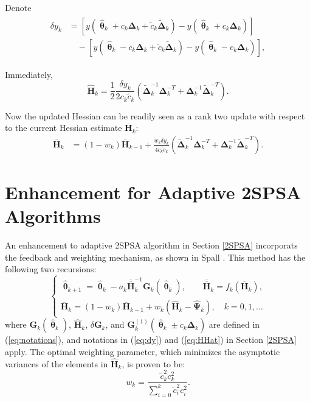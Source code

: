 \documentclass[conference]{IEEEtran}
\newcommand{\bG}{\bm{G}}
\newcommand{\bDelta}{\bm{\Delta}}
\newcommand{\oH}{\bm{\overline{H}}}
\newcommand{\ooH}{\bm{\overline{\overline{H}}}}
\newcommand{\hH}{\bm{\hat{H}}}
\newcommand{\hPsi}{\bm{\hat{\Psi}}}
\newcommand{\htheta}{\bm{\hat{\uptheta}}}
\newcommand{\tDelta}{\bm{\tilde{\Delta}}}
\begin{document}
	Denote
	\begin{align} \label{eq:dy}
		\begin{split}
			\delta y_k&=[y(\htheta_k+c_k\bDelta_k+\tilde{c}_k\tDelta_k)-y(\htheta_k+c_k\bDelta_k)]\\
			&\quad-[y(\htheta_k-c_k\bDelta_k+\tilde{c}_k\tDelta_k)-y(\htheta_k-c_k\bDelta_k)],
		\end{split}
	\end{align}
	
	Immediately,
	\begin{equation} \label{eq:HHat}
		\hH_k=\frac{1}{2}\frac{\delta y_k}{2c_k\tilde{c}_k}\left( \tDelta_k^{-1}\bDelta_k^{-T}+\bDelta_k^{-1}\tDelta_k^{-T} \right).
	\end{equation}
	
	Now the updated Hessian can be readily seen as a rank two update with respect to
	the current Hessian estimate $\oH_k$:
	\begin{align*}
		\oH_k
		&= (1 - w_k)\oH_{k-1}
		+ \frac{w_k \delta y_k}{4c_k\tilde{c}_k}
		(\tDelta_k^{-1}\bDelta_k^{-T}+\bDelta_k^{-1}\tDelta_k^{-T}).
	\end{align*}
		
	
	\section{Enhancement for Adaptive 2SPSA Algorithms} \label{Enhanced 2SPSA}
	An enhancement to adaptive 2SPSA algorithm in Section \ref{2SPSA} incorporats the feedback and weighting mechanism, as shown in Spall \cite{Spall2009}. This method has the following two recursions:
	\begin{equation} \label{eq:Enhancement}
		\begin{cases}
			\htheta_{k+1}=\htheta_k-a_k\ooH_k^{-1} \bG_k(\htheta_k),\qquad \bm{\ooH}_k=f_k(\oH_k),\\
			\oH_k=(1-w_k)\oH_{k-1}+w_k(\hH_k-\hPsi_k), \quad k=0,1,\dots
		\end{cases}
	\end{equation}
	where $\bG_k(\htheta_k)$, $\hH_k$, $\delta\bG_k$, and $\bG_k^{(1)}(\htheta_k\pm c_k\bDelta_k)$ are defined in (\ref{eq:notations}), and notations in (\ref{eq:dy}) and (\ref{eq:HHat}) in Section \ref{2SPSA} apply. The optimal weighting parameter, which minimizes the asymptotic variances of the elements in $\hH_k$, is proven to be:
	\begin{equation} \label{eq:weighting}
		w_k=\frac{\tilde{c}_k^2c_k^2}{\sum_{i=0}^{k}\tilde{c}_i^2c_i^2}.
	\end{equation}
	
\end{document}
